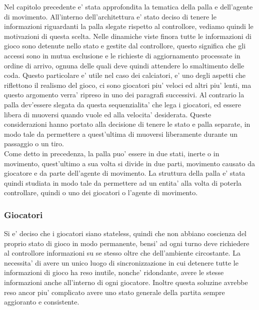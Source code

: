 Nel capitolo precedente e’ stata approfondita la tematica della palla e dell’agente di movimento. All’interno dell’architettura e’ stato deciso di tenere le informazioni riguardanti la palla slegate rispetto al controllore, vediamo quindi le motivazioni di questa scelta. Nelle dinamiche viste finora tutte le informazioni di gioco sono detenute nello stato e gestite dal controllore, questo significa che gli accessi sono in mutua esclusione e le richieste di aggiornamento processate in ordine di arrivo, ognuna delle quali deve quindi attendere lo smaltimento delle coda. Questo particolare e’ utile nel caso dei calciatori, e’ uno degli aspetti che riflettono il realismo del gioco, ci sono giocatori piu’ veloci ed altri piu’ lenti, ma questo argomento verra’ ripreso in uno dei paragrafi successivi. Al contrario la palla dev’essere slegata da questa sequenzialita’ che lega i giocatori, ed essere libera di muoversi quando vuole ed alla velocita’ desiderata. Queste considerazioni hanno portato alla decisione di tenere le stato e palla separate, in modo tale da permettere a quest’ultima di muoversi liberamente durante un passaggio o un tiro.\\

Come detto in precedenza, la palla puo’ essere in due stati, inerte o in movimento, quest’ultimo a sua volta si divide in due parti, movimento causato da giocatore e da parte dell’agente di movimento. La struttura della palla e’ stata quindi studiata in modo tale da permettere ad un entita’ alla volta di poterla controllare, quindi o uno dei giocatori o l’agente di movimento.

\subsubsection*{Giocatori}
%
\label{sec:analisi_concorrenza_giocatori}

Si e’ deciso che i giocatori siano stateless, quindi che non abbiano coscienza del proprio stato di gioco in modo permanente, bensi’ ad ogni turno deve richiedere al controllore informazioni su se stesso oltre che dell’ambiente circostante. La necessita’ di avere un unico luogo di sincronizzazione in cui detenere tutte le informazioni di gioco ha reso inutile, nonche’ ridondante, avere le stesse informazioni anche all’interno di ogni giocatore. Inoltre questa soluzine avrebbe reso ancor piu’ complicato avere uno stato generale della partita sempre aggioranto e consistente.\\


